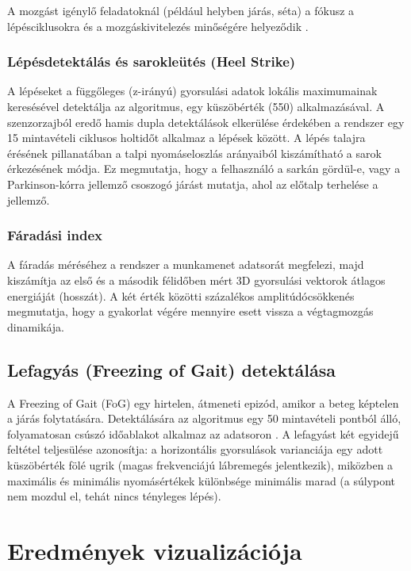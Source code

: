 A mozgást igénylő feladatoknál (például helyben járás, séta) a fókusz a lépésciklusokra
és a mozgáskivitelezés minőségére helyeződik \cite{gaitanalysis}.

\subsubsection{Lépésdetektálás és sarokleütés (Heel Strike)}

A lépéseket a függőleges (z-irányú) gyorsulási adatok lokális maximumainak keresésével
 detektálja az algoritmus, egy küszöbérték (550) alkalmazásával. A szenzorzajból
eredő hamis dupla detektálások elkerülése érdekében a rendszer egy 15 mintavételi
ciklusos holtidőt alkalmaz a lépések között. A lépés talajra érésének pillanatában a
talpi nyomáseloszlás arányaiból kiszámítható a sarok érkezésének módja.
Ez megmutatja, hogy a felhasználó a sarkán gördül-e, vagy a Parkinson-kórra
jellemző csoszogó járást mutatja, ahol az előtalp terhelése a jellemző.

\subsubsection{Fáradási index}

A fáradás méréséhez a rendszer a munkamenet adatsorát megfelezi, majd kiszámítja
az első és a második félidőben mért 3D gyorsulási vektorok átlagos energiáját (hosszát).
A két érték közötti százalékos amplitúdócsökkenés megmutatja, hogy a gyakorlat végére
mennyire esett vissza a végtagmozgás dinamikája.

\subsection{Lefagyás (Freezing of Gait) detektálása}

A Freezing of Gait (FoG) egy hirtelen, átmeneti epizód, amikor a beteg képtelen
a járás folytatására. Detektálására az algoritmus egy 50 mintavételi pontból álló,
folyamatosan csúszó időablakot alkalmaz az adatsoron \cite{fogdetection}.
A lefagyást két egyidejű feltétel teljesülése azonosítja: a horizontális gyorsulások
varianciája egy adott küszöbérték fölé ugrik (magas frekvenciájú lábremegés jelentkezik),
miközben a maximális és minimális nyomásértékek különbsége minimális marad
(a súlypont nem mozdul el, tehát nincs tényleges lépés).

\section{Eredmények vizualizációja}

